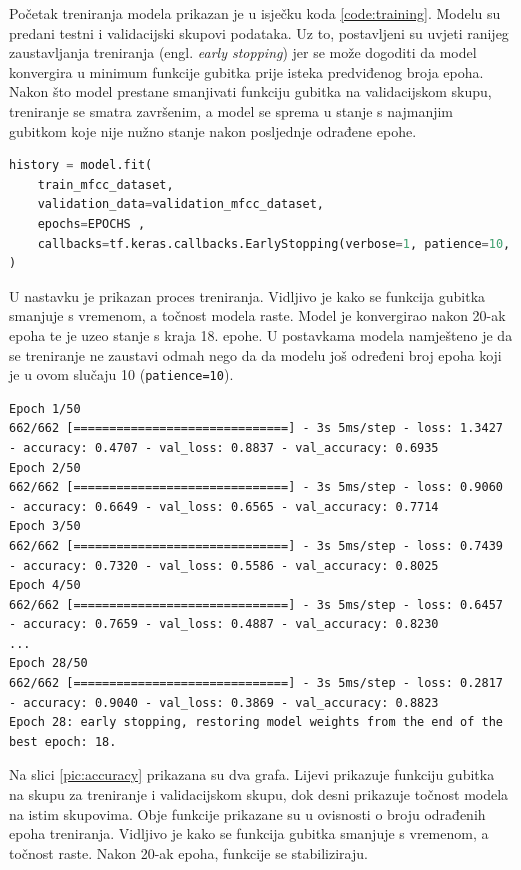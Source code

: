 Početak treniranja modela prikazan je u isječku koda \ref{code:training}. Modelu
su predani testni i validacijski skupovi podataka. Uz to, postavljeni su uvjeti ranijeg
zaustavljanja treniranja (engl. \textit{early stopping}) jer se može dogoditi da model
konvergira u minimum funkcije gubitka prije isteka predviđenog broja epoha. Nakon
što model prestane smanjivati funkciju gubitka na validacijskom skupu, treniranje
se smatra završenim, a model se sprema u stanje s najmanjim gubitkom koje nije nužno 
stanje nakon posljednje odrađene epohe.

\begin{lstlisting}[language=Python, caption=Trening, label=code:training]
history = model.fit(
    train_mfcc_dataset,
    validation_data=validation_mfcc_dataset,
    epochs=EPOCHS ,
    callbacks=tf.keras.callbacks.EarlyStopping(verbose=1, patience=10, restore_best_weights=True),
)
\end{lstlisting}

U nastavku je prikazan proces treniranja. Vidljivo je kako se funkcija
gubitka smanjuje s vremenom, a točnost modela raste. Model je konvergirao nakon 20-ak
epoha te je uzeo stanje s kraja 18. epohe. U postavkama modela namješteno je da se
treniranje ne zaustavi odmah nego da da modelu još određeni broj epoha koji je
u ovom slučaju 10 (\texttt{patience=10}).

{
\tiny
\begin{verbatim}
Epoch 1/50
662/662 [==============================] - 3s 5ms/step - loss: 1.3427 - accuracy: 0.4707 - val_loss: 0.8837 - val_accuracy: 0.6935
Epoch 2/50
662/662 [==============================] - 3s 5ms/step - loss: 0.9060 - accuracy: 0.6649 - val_loss: 0.6565 - val_accuracy: 0.7714
Epoch 3/50
662/662 [==============================] - 3s 5ms/step - loss: 0.7439 - accuracy: 0.7320 - val_loss: 0.5586 - val_accuracy: 0.8025
Epoch 4/50
662/662 [==============================] - 3s 5ms/step - loss: 0.6457 - accuracy: 0.7659 - val_loss: 0.4887 - val_accuracy: 0.8230
...
Epoch 28/50
662/662 [==============================] - 3s 5ms/step - loss: 0.2817 - accuracy: 0.9040 - val_loss: 0.3869 - val_accuracy: 0.8823
Epoch 28: early stopping, restoring model weights from the end of the best epoch: 18.
\end{verbatim}
}

Na slici \ref{pic:accuracy} prikazana su dva grafa. Lijevi prikazuje funkciju gubitka
na skupu za treniranje i validacijskom skupu, dok desni prikazuje točnost modela na istim skupovima.
Obje funkcije prikazane su u ovisnosti o broju odrađenih epoha treniranja. Vidljivo je
kako se funkcija gubitka smanjuje s vremenom, a točnost raste. Nakon 20-ak epoha, funkcije
se stabiliziraju. 

